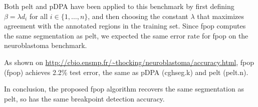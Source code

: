 \documentclass{article}
\begin{document}
Both pelt and pDPA have been applied to this benchmark by first
defining $\beta = \lambda d_i$ for all $i\in\{1, \dots, n\}$, and then
choosing the constant $\lambda$ that maximizes agreement with the
annotated regions in the training set. Since fpop computes the same
segmentation as pelt, we expected the same error rate for
fpop on the neuroblastoma benchmark.

As shown on
\url{http://cbio.ensmp.fr/~thocking/neuroblastoma/accuracy.html}, fpop
(fpop) achieves 2.2\% test error, the same as pDPA (cghseg.k) and pelt
(pelt.n).

In conclusion, the proposed fpop algorithm recovers the same
segmentation as pelt, so has the same breakpoint detection
accuracy.





\end{document}
